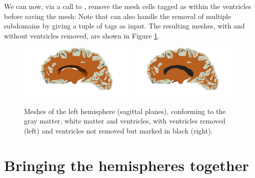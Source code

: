 We can now, via a call to \svmtk{} ,
remove the mesh cells tagged as within the ventricles before saving
the mesh:
Note that  can also handle the removal of
multiple subdomains by giving a tuple of tags as input. The resulting
meshes, with and without ventricles removed, are shown in Figure
\ref{fig:chp4:tags-with-without-ventricles}.
\begin{center}
\begin{figure}
  \includegraphics[width=0.49\textwidth]{./chapters/chp4/FIG/ernie-final-comp-b}
  \includegraphics[width=0.49\textwidth]{./chapters/chp4/FIG/ernie-final-comp-d}
    \caption{Meshes of the left hemisphere (sagittal planes),
      conforming to the gray matter, white matter and ventricles, with
      ventricles removed (left) and ventricles not removed but marked
      in black (right).}
    \label{fig:chp4:tags-with-without-ventricles}
\end{figure}
\end{center}

\section{Bringing the hemispheres together}
\label{sec:chp4-left-right-tagged}

